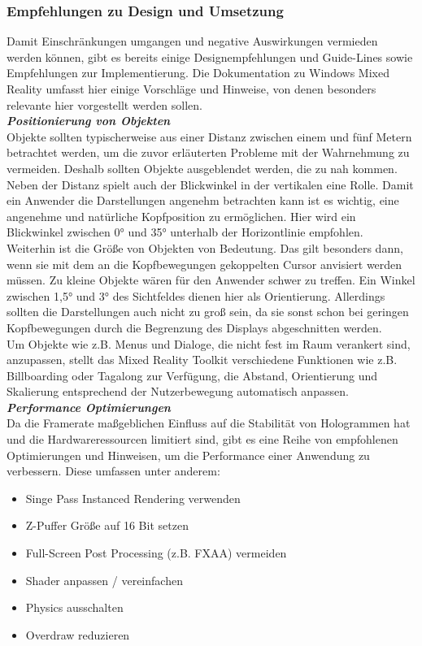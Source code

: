 \subsubsection{Empfehlungen zu Design und Umsetzung}
\label{sec-2-1-5}
Damit Einschränkungen umgangen und negative Auswirkungen vermieden werden können, gibt es bereits einige Designempfehlungen und Guide-Lines sowie Empfehlungen zur Implementierung. Die Dokumentation zu Windows Mixed Reality umfasst hier einige Vorschläge und Hinweise, von denen besonders relevante hier vorgestellt werden sollen.\\

\textbf{\textit{Positionierung von Objekten}}\\
Objekte sollten typischerweise aus einer Distanz zwischen einem und fünf Metern betrachtet werden, um die zuvor erläuterten Probleme mit der Wahrnehmung zu vermeiden. Deshalb sollten Objekte ausgeblendet werden, die zu nah kommen. Neben der Distanz spielt auch der Blickwinkel in der vertikalen eine Rolle. Damit ein Anwender die Darstellungen angenehm betrachten kann ist es wichtig, eine angenehme und natürliche Kopfposition zu ermöglichen. Hier wird ein Blickwinkel zwischen 0° und 35° unterhalb der Horizontlinie empfohlen.\\

Weiterhin ist die Größe von Objekten von Bedeutung. Das gilt besonders dann, wenn sie mit dem an die Kopfbewegungen gekoppelten Cursor anvisiert werden müssen. Zu kleine Objekte wären für den Anwender schwer zu treffen. Ein Winkel zwischen 1,5° und 3° des Sichtfeldes dienen hier als Orientierung. Allerdings sollten die Darstellungen auch nicht zu groß sein, da sie sonst schon bei geringen Kopfbewegungen durch die Begrenzung des Displays abgeschnitten werden.\\

Um Objekte wie z.B. Menus und Dialoge, die nicht fest im Raum verankert sind, anzupassen, stellt das Mixed Reality Toolkit verschiedene Funktionen wie z.B. Billboarding oder Tagalong zur Verfügung, die Abstand, Orientierung und Skalierung entsprechend der Nutzerbewegung automatisch anpassen.\\

\textbf{\textit{Performance Optimierungen}}\\
Da die Framerate maßgeblichen Einfluss auf die Stabilität von Hologrammen hat und die Hardwareressourcen limitiert sind, gibt es eine Reihe von empfohlenen Optimierungen und Hinweisen, um die Performance einer Anwendung zu verbessern. Diese umfassen unter anderem:
\begin{itemize}[topsep=-2px]
	\setlength{\itemsep}{-1pt}
	\singlespacing
	\item Singe Pass Instanced Rendering verwenden
	\item Z-Puffer Größe auf 16 Bit setzen
	\item Full-Screen Post Processing (z.B. FXAA) vermeiden
	\item Shader anpassen / vereinfachen
	\item Physics ausschalten
	\item Overdraw reduzieren
\end{itemize}
\vspace{6px}

